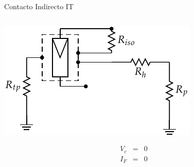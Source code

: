 \documentclass[xcolor={usenames,svgnames,dvipsnames}]{beamer}
\begin{document}
\begin{frame}[label={sec:org03291de}]{Contacto Indirecto IT}
\begin{columns}
\begin{column}{0.5\columnwidth}
\begin{center}
\includegraphics[width=\textwidth]{../figs/ContactoIndirectoIT.pdf}
\end{center}

$$\begin{aligned}
V_{c} & = & 0\\
I_{F} & = & 0\end{aligned}$$
\end{column}


\end{columns}
\end{frame}
\end{document}
